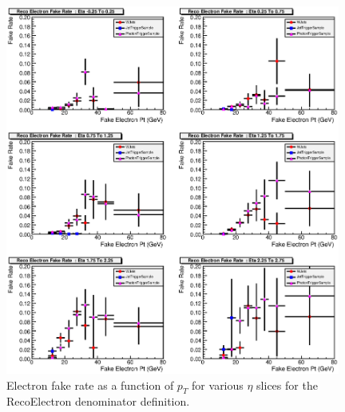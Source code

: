 \documentclass{cmspaper}
\begin{document}
\begin{figure}[htb]
\begin{center}
\includegraphics[width=0.98\textwidth]{plots/RecoElectronFakeRateEtaSlices.eps}
   \caption{Electron fake rate as a function of $p_T$ for various $\eta$ slices for the RecoElectron denominator definition. }
   \label{fig:electronFR_reco_etaslices}
\end{center}
\end{figure}
\end{document}
